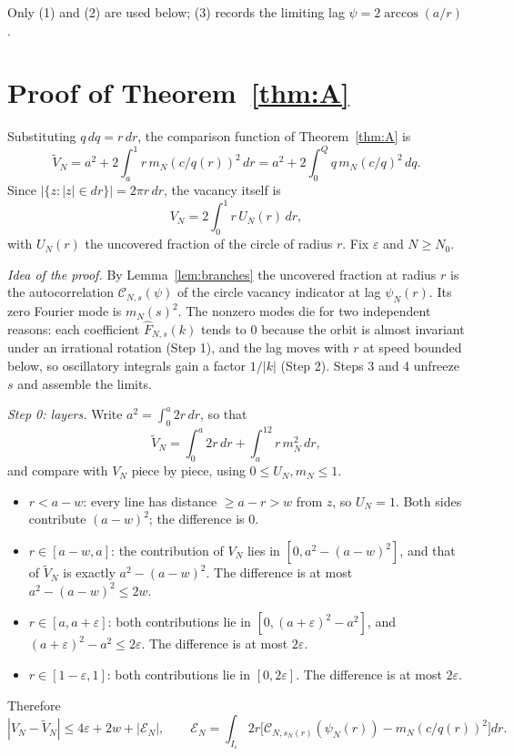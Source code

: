Only (1) and (2) are used below; (3) records the limiting lag $\psi=2\arccos(a/r)$.

\section{Proof of Theorem~\ref{thm:A}}\label{sec:proofA}

Substituting $q\,dq=r\,dr$, the comparison function of Theorem~\ref{thm:A} is
\begin{equation}\label{deph:eq:Vtilde}
\widetilde V_N=a^2+2\int_a^1r\,m_N(c/q(r))^2\,dr=a^2+2\int_0^Qq\,m_N(c/q)^2\,dq .
\end{equation}
Since $|\{z:|z|\in dr\}|=2\pi r\,dr$, the vacancy itself is
\[
V_N=2\int_0^1 r\,U_N(r)\,dr ,
\]
with $U_N(r)$ the uncovered fraction of the circle of radius $r$.
Fix $\varepsilon$ and $N\ge N_0$.

\emph{Idea of the proof.} By Lemma~\ref{lem:branches} the uncovered fraction at radius $r$ is the autocorrelation $\mathcal C_{N,s}(\psi)$ of the circle vacancy indicator at lag $\psi_N(r)$. Its zero Fourier mode is $m_N(s)^2$. The nonzero modes die for two independent reasons: each coefficient $\hat F_{N,s}(k)$ tends to $0$ because the orbit is almost invariant under an irrational rotation (Step 1), and the lag moves with $r$ at speed bounded below, so oscillatory integrals gain a factor $1/|k|$ (Step 2). Steps 3 and 4 unfreeze $s$ and assemble the limits.

\emph{Step 0: layers.} Write $a^2=\int_0^a2r\,dr$, so that
\[
\widetilde V_N=\int_0^a2r\,dr+\int_a^12r\,m_N^2\,dr ,
\]
and compare with $V_N$ piece by piece, using $0\le U_N,m_N\le1$.
\begin{itemize}
\item $r<a-w$: every line has distance $\ge a-r>w$ from $z$, so $U_N=1$. Both sides contribute $(a-w)^2$; the difference is $0$.
\item $r\in[a-w,a]$: the contribution of $V_N$ lies in $[0,a^2-(a-w)^2]$, and that of $\widetilde V_N$ is exactly $a^2-(a-w)^2$. The difference is at most $a^2-(a-w)^2\le2w$.
\item $r\in[a,a+\varepsilon]$: both contributions lie in $[0,(a+\varepsilon)^2-a^2]$, and $(a+\varepsilon)^2-a^2\le2\varepsilon$. The difference is at most $2\varepsilon$.
\item $r\in[1-\varepsilon,1]$: both contributions lie in $[0,2\varepsilon]$. The difference is at most $2\varepsilon$.
\end{itemize}
Therefore
\begin{equation}\label{deph:layers}
|V_N-\widetilde V_N|\le4\varepsilon+2w+|\mathcal E_N|,\qquad
\mathcal E_N=\int_{I_\varepsilon}2r\bigl[\mathcal C_{N,s_N(r)}(\psi_N(r))-m_N(c/q(r))^2\bigr]dr .
\end{equation}

